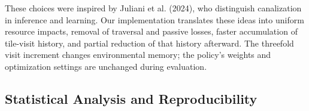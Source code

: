 \documentclass[12pt,fleqn]{article}
\begin{document}
These choices were inspired by Juliani et al. (2024), who distinguish canalization in inference and learning. Our implementation translates these ideas into uniform resource impacts, removal of traversal and passive losses, faster accumulation of tile-visit history, and partial reduction of that history afterward. The threefold visit increment changes environmental memory; the policy's weights and optimization settings are unchanged during evaluation.
\subsection{Statistical Analysis and Reproducibility}\label{sec:stats}
\end{document}
